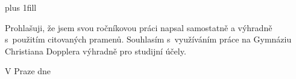 \openright
\hypersetup{pageanchor=true}
\pagestyle{plain}
\vglue 0pt plus 1fill

\noindent
Prohlašuji, že jsem svou ročníkovou práci napsal samostatně a výhradně s~použitím citovaných pramenů. Souhlasím s~využíváním práce na Gymnáziu Christiana Dopplera výhradně pro studijní účely.
\vspace{10mm}

\noindent V Praze dne \DatumDokonceni
\hfill
\AutorPrace

\vspace{20mm}
\newpage

\openright
\pagestyle{plain}
\setcounter{page}{2}